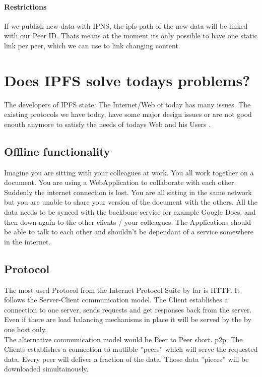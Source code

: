 \documentclass[a4paper,11pt, oneside]{report}
\theoremstyle{definition}
\begin{document}
\subsubsection{Restrictions}
If we publish new data with IPNS, the ipfs path of the new data will be linked with our Peer ID. Thats means at the moment its only possible to have one static link per peer, which we can use to link changing content.




\chapter{Does IPFS solve todays problems?}
The developers of IPFS  state: The Internet/Web of today has many issues.  The existing protocols we have today, have some major design issues or are not good enouth anymore to satisfy the needs of todays Web and his Users \cite{TodaysProblems}.


\section{Offline functionality}
Imagine you are sitting with your colleagues at work. You all work together on a document. You are using a WebApplication to collaborate with each other. Suddenly the internet connection is lost. You are all sitting in the same network but you are unable to share your version of the document with the others. All the data needs to be synced with the backbone service for example Google Docs. and then down again to the other clients / your colleagues. The Applications should be able to talk to each other and shouldn't be dependant of a service somewhere in the internet.

\section{Protocol}
The most used Protocol from the Internet Protocol Suite by far is HTTP. It follows the Server-Client communication model. The Client establishes a connection to one server, sends requests and get responses back from the server. Even if there are load balancing mechanisms in place it will be served by the by one host only.\\[0.3cm]
The alternative communication model would be Peer to Peer short. p2p. The Clients establishes a connection to mutlible ''peers'' which will serve the requested data. Every peer will deliver a fraction of the data. Those data ''pieces'' will be downloaded simultainously.
\end{document}

